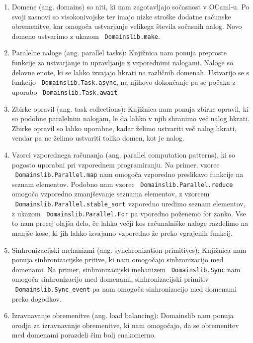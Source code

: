 \documentclass[mat1, tisk]{fmfdelo}
\begin{document}
\begin{enumerate}
  \item Domene (ang. domains) so niti, ki nam zagotavljajo sočasnost v OCaml-u. 
        Po svoji zasnovi so visokonivojske ter imajo nizke stroške dodatne računske obremenitve, 
        kar omogoča ustvarjanje velikega števila sočasnih nalog. Novo domeno ustvarimo z ukazom ~\texttt{Domainslib.make}.
  \item Paralelne naloge (ang. parallel tasks): Knjižnica nam ponuja preproste funkcije za ustvarjanje in upravljanje z vzporednimi nalogami.
        Naloge so delovne enote, ki se lahko izvajajo hkrati na različnih domenah.
        Ustvarijo se s funkcijo ~\texttt{Domainslib.Task.async}, na njihovo dokončanje pa se počaka z uporabo ~\texttt{Domainslib.Task.await}
  \item Zbirke opravil (ang. task collections): Knjižnica nam ponuja zbirke opravil, ki so podobne paralelnim nalogam, 
        le da lahko v njih shranimo več nalog hkrati. Zbirke opravil so lahko uporabne, kadar želimo ustvariti več nalog hkrati, 
        vendar pa ne želimo ustvariti toliko domen, kot je nalog.
  \item Vzorci vzporednega računanja (ang. parallel computation patterns), ki so pogosto uporabni pri vzporednem programiranju.
        Na primer, vzorec ~\texttt{Domainslib.Parallel.map} nam omogoča vzporedno preslikavo funkcije na seznam elementov. 
        Podobno nam vzorec ~\texttt{Domainslib.Parallel.reduce} omogoča vzporedno zmanjševanje seznama elementov, 
        z vzorcem ~\texttt{Domainslib.Parallel.stable\_sort} vzporedno uredimo seznam elementov, 
        z ukazom ~\texttt{Domainslib.Parallel.For} pa vporedno poženemo for zanko. Vse to nam precej olajša delo, če lahko večji kos računalniške naloge
        razdelimo na manjše kose, ki jih lahko izvajamo vzporedno že preko vgrajenih funkcij.
  \item Sinhronizacijski mehanizmi (ang. synchronization primitives): Knjižnica nam ponuja sinhronizacijske pritive, ki nam omogočajo sinhronizacijo med domenami.
        Na primer, sinhronizacijski mehanizem ~\texttt{Domainslib.Sync} nam omogoča sinhronizacijo med domenami, 
        sinhronizacijski primitiv ~\texttt{Domainslib.Sync\_event} pa nam omogoča sinhronizacijo med domenami preko dogodkov.
  \item Izravnavanje obremenitve (ang. load balancing): Domainslib nam ponuja orodja za izravnavanje obremenitve, 
        ki nam omogočajo, da se obremenitev med domenami porazdeli čim bolj enakomerno.
\end{enumerate}
\end{document}
